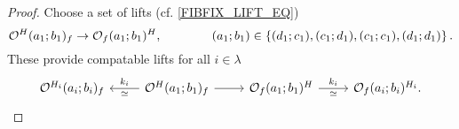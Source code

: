 \documentclass[a4paper,10pt
]{article}%
\renewcommand{\1}{\ensuremath{\mathbb{id}}}
\begin{document}
\begin{proof}
      Choose a set of lifts (cf. \eqref{FIBFIX_LIFT_EQ})
      \begin{equation}
            \mathcal{O}^H(a_1;b_1)_f \to \mathcal{O}_f(a_1;b_1)^H,
            \qquad \qquad
            (a_1;b_1) \in  \left\{(d_1;c_1), (c_1;d_1), (c_1;c_1), (d_1;d_1)\right\}.
      \end{equation}
      These provide compatable lifts for all $i \in \lambda$
      \begin{equation}
            \begin{tikzcd}
                  \O^{H_i}(a_i;b_i)_f
                  &
                  \O^H(a_1;b_1)_f \arrow[l, "\simeq", "k_i"'] \arrow[r]
                  &
                  \O_f(a_1;b_1)^H \arrow[r, "\simeq"', "k_i"]
                  &
                  \O_f(a_i;b_i)^{H_i}.
            \end{tikzcd}
      \end{equation}
      

\end{proof}
\end{document}
